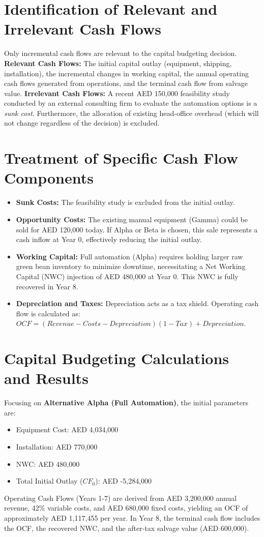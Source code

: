 \documentclass[12pt]{article}
\begin{document}
\section{Identification of Relevant and Irrelevant Cash Flows}
Only incremental cash flows are relevant to the capital budgeting decision. 
\textbf{Relevant Cash Flows:} The initial capital outlay (equipment, shipping, installation), the incremental changes in working capital, the annual operating cash flows generated from operations, and the terminal cash flow from salvage value.
\textbf{Irrelevant Cash Flows:} A recent AED 150,000 feasibility study conducted by an external consulting firm to evaluate the automation options is a \textit{sunk cost}. Furthermore, the allocation of existing head-office overhead (which will not change regardless of the decision) is excluded. 

\section{Treatment of Specific Cash Flow Components}
\begin{itemize}
    \item \textbf{Sunk Costs:} The feasibility study is excluded from the initial outlay.
    \item \textbf{Opportunity Costs:} The existing manual equipment (Gamma) could be sold for AED 120,000 today. If Alpha or Beta is chosen, this sale represents a cash inflow at Year 0, effectively reducing the initial outlay.
    \item \textbf{Working Capital:} Full automation (Alpha) requires holding larger raw green bean inventory to minimize downtime, necessitating a Net Working Capital (NWC) injection of AED 480,000 at Year 0. This NWC is fully recovered in Year 8.
    \item \textbf{Depreciation and Taxes:} Depreciation acts as a tax shield. Operating cash flow is calculated as: $OCF = (Revenue - Costs - Depreciation)(1 - Tax) + Depreciation$.
\end{itemize}

\section{Capital Budgeting Calculations and Results}
Focusing on \textbf{Alternative Alpha (Full Automation)}, the initial parameters are:
\begin{itemize}
    \item Equipment Cost: AED 4,034,000
    \item Installation: AED 770,000
    \item NWC: AED 480,000
    \item Total Initial Outlay ($CF_0$): AED -5,284,000
\end{itemize}
Operating Cash Flows (Years 1-7) are derived from AED 3,200,000 annual revenue, 42\% variable costs, and AED 680,000 fixed costs, yielding an OCF of approximately AED 1,117,455 per year. In Year 8, the terminal cash flow includes the OCF, the recovered NWC, and the after-tax salvage value (AED 600,000).
\end{document}
